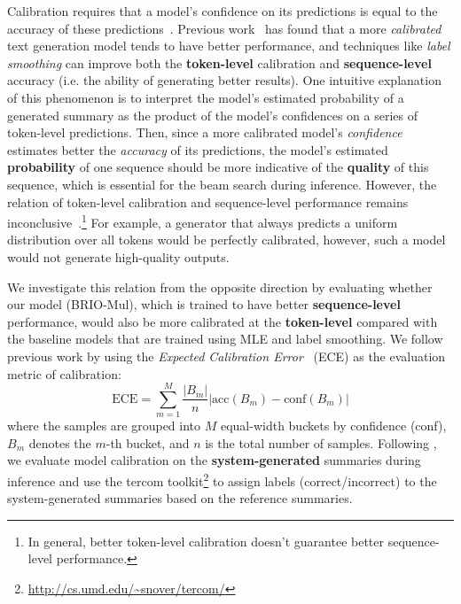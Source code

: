 \documentclass[11pt]{article}
\newcommand{\model}{BRIO\xspace}
\begin{document}
Calibration requires that a model's confidence on its predictions is equal to the accuracy of these predictions~\citep{pmlr-v70-guo17a}.
Previous work~\citep{NEURIPS2019_f1748d6b, DBLP:journals/corr/abs-1903-00802, wang-etal-2020-inference} has found that a more \textit{calibrated} text generation model tends to have better performance, and 
techniques like \textit{label smoothing} can improve both the \textbf{token-level} calibration and \textbf{sequence-level} accuracy (i.e. the ability of generating better results).
One intuitive explanation of this phenomenon is to interpret the model's estimated probability of a generated summary as the product of the model's confidences on a series of token-level predictions.
Then, since a more calibrated model's \textit{confidence} estimates better the \textit{accuracy} of its predictions, the model's estimated \textbf{probability} of one sequence should be more indicative of the \textbf{quality} of this sequence, which is essential for the beam search during inference. 
However, the relation of token-level calibration and sequence-level performance remains inconclusive~\citep{NEURIPS2019_f1748d6b}.\footnote{In general, better token-level calibration doesn't guarantee better sequence-level performance.} 
For example, a generator that always predicts a uniform distribution over all tokens would be perfectly calibrated, however, such a model would not generate high-quality outputs.

We investigate this relation from the opposite direction by evaluating whether our model (\model-Mul), which is trained to have better \textbf{sequence-level} performance, would also be more calibrated at the \textbf{token-level} compared with the baseline models that are trained using MLE and label smoothing.
We follow previous work by using the \textit{Expected Calibration Error}~\citep{10.5555/2888116.2888120} (ECE) as the evaluation metric of calibration:
\begin{equation}
    \textrm{ECE} = \sum_{m=1}^M \frac{|B_m|}{n} | \textrm{acc}(B_m) - \textrm{conf}(B_m) |
\end{equation}
where the samples are grouped into $M$ equal-width buckets by confidence (conf), $B_m$ denotes the $m$-th bucket, and $n$ is the total number of samples.
Following \citet{wang-etal-2020-inference}, we evaluate model calibration on the \textbf{system-generated} summaries during inference and use the tercom toolkit\footnote{\url{http://cs.umd.edu/~snover/tercom/}} 
to assign labels (correct/incorrect) to the system-generated summaries based on the reference summaries.
\end{document}
